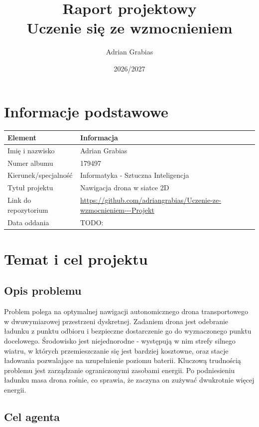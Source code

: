 \documentclass[12pt]{article}
\title{Raport projektowy\\Uczenie się ze wzmocnieniem}
\author{Adrian Grabias}
\date{2026/2027}
\begin{document}
\maketitle
\tableofcontents
\newpage

\section{Informacje podstawowe}

\begin{center}
\begin{tabular}{p{}p{}}
\toprule
Element & Informacja \\
\midrule
Imię i nazwisko & Adrian Grabias \\
Numer albumu & 179497 \\
Kierunek/specjalność & Informatyka - Sztuczna Inteligencja \\
Tytuł projektu & Nawigacja drona w siatce 2D \\
Link do repozytorium & \url{https://github.com/adriangrabias/Uczenie-ze-wzmocnieniem---Projekt} \\
Data oddania & TODO: \\
\bottomrule
\end{tabular}
\end{center}

\section{Temat i cel projektu}

\subsection{Opis problemu}
Problem polega na optymalnej nawigacji autonomicznego drona transportowego w dwuwymiarowej przestrzeni dyskretnej. Zadaniem drona jest odebranie ładunku z punktu odbioru i bezpieczne dostarczenie go do wyznaczonego punktu docelowego.
Środowisko jest niejednorodne - występują w nim strefy silnego wiatru, w których przemieszczanie się jest bardziej kosztowne, oraz stacje ładowania pozwalające na uzupełnienie poziomu baterii. Kluczową trudnością problemu jest zarządzanie ograniczonymi zasobami energii. Po podniesieniu ładunku 
masa drona rośnie, co sprawia, że zaczyna on zużywać dwukrotnie więcej energii.


\subsection{Cel agenta}
\end{document}
